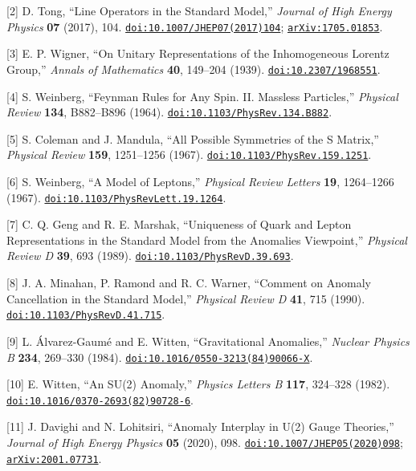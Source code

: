 \documentclass[
  11pt,
  a4paper,
]{article}
\begin{document}
{[}2{]} D. Tong, ``Line Operators in the Standard Model,'' \emph{Journal of High Energy Physics} \textbf{07} (2017), 104. \href{https://doi.org/10.1007/JHEP07(2017)104}{\nolinkurl{doi:10.1007/JHEP07(2017)104}}; \href{https://arxiv.org/abs/1705.01853}{\nolinkurl{arXiv:1705.01853}}.

{[}3{]} E. P. Wigner, ``On Unitary Representations of the Inhomogeneous Lorentz Group,'' \emph{Annals of Mathematics} \textbf{40}, 149--204 (1939). \href{https://doi.org/10.2307/1968551}{\nolinkurl{doi:10.2307/1968551}}.

{[}4{]} S. Weinberg, ``Feynman Rules for Any Spin. II. Massless Particles,'' \emph{Physical Review} \textbf{134}, B882--B896 (1964). \href{https://doi.org/10.1103/PhysRev.134.B882}{\nolinkurl{doi:10.1103/PhysRev.134.B882}}.

{[}5{]} S. Coleman and J. Mandula, ``All Possible Symmetries of the S Matrix,'' \emph{Physical Review} \textbf{159}, 1251--1256 (1967). \href{https://doi.org/10.1103/PhysRev.159.1251}{\nolinkurl{doi:10.1103/PhysRev.159.1251}}.

{[}6{]} S. Weinberg, ``A Model of Leptons,'' \emph{Physical Review Letters} \textbf{19}, 1264--1266 (1967). \href{https://doi.org/10.1103/PhysRevLett.19.1264}{\nolinkurl{doi:10.1103/PhysRevLett.19.1264}}.

{[}7{]} C. Q. Geng and R. E. Marshak, ``Uniqueness of Quark and Lepton Representations in the Standard Model from the Anomalies Viewpoint,'' \emph{Physical Review D} \textbf{39}, 693 (1989). \href{https://doi.org/10.1103/PhysRevD.39.693}{\nolinkurl{doi:10.1103/PhysRevD.39.693}}.

{[}8{]} J. A. Minahan, P. Ramond and R. C. Warner, ``Comment on Anomaly Cancellation in the Standard Model,'' \emph{Physical Review D} \textbf{41}, 715 (1990). \href{https://doi.org/10.1103/PhysRevD.41.715}{\nolinkurl{doi:10.1103/PhysRevD.41.715}}.

{[}9{]} L. Álvarez-Gaumé and E. Witten, ``Gravitational Anomalies,'' \emph{Nuclear Physics B} \textbf{234}, 269--330 (1984). \href{https://doi.org/10.1016/0550-3213(84)90066-X}{\nolinkurl{doi:10.1016/0550-3213(84)90066-X}}.

{[}10{]} E. Witten, ``An SU(2) Anomaly,'' \emph{Physics Letters B} \textbf{117}, 324--328 (1982). \href{https://doi.org/10.1016/0370-2693(82)90728-6}{\nolinkurl{doi:10.1016/0370-2693(82)90728-6}}.

{[}11{]} J. Davighi and N. Lohitsiri, ``Anomaly Interplay in U(2) Gauge Theories,'' \emph{Journal of High Energy Physics} \textbf{05} (2020), 098. \href{https://doi.org/10.1007/JHEP05(2020)098}{\nolinkurl{doi:10.1007/JHEP05(2020)098}}; \href{https://arxiv.org/abs/2001.07731}{\nolinkurl{arXiv:2001.07731}}.
\end{document}
